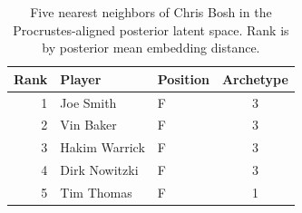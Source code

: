 \begin{table}[htbp]
  \centering\small
  \begin{tabular}{rllc}
    \toprule
    Rank & Player & Position & Archetype \\
    \midrule
    1 & Joe Smith & F & 3 \\
    2 & Vin Baker & F & 3 \\
    3 & Hakim Warrick & F & 3 \\
    4 & Dirk Nowitzki & F & 3 \\
    5 & Tim Thomas & F & 1 \\
    \bottomrule
  \end{tabular}
  \caption{Five nearest neighbors of Chris Bosh in the Procrustes-aligned posterior latent space. Rank is by posterior mean embedding distance.}
  \label{tab:Chris_Bosh_neighbors}
\end{table}

